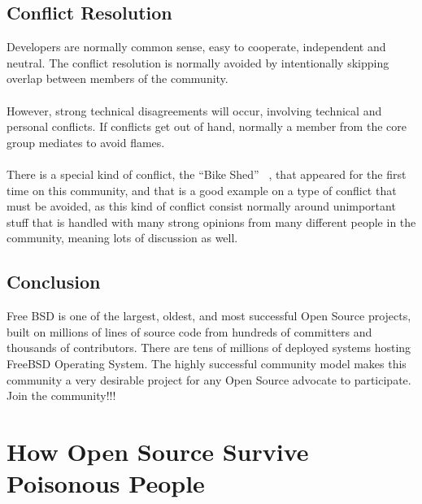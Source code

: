 \documentclass[11pt]{article}
\begin{document}
\subsection{Conflict Resolution}
Developers are normally common sense, easy to cooperate, independent and neutral. The conflict resolution is normally avoided by intentionally skipping overlap between members of the community.\\
\\
However, strong technical disagreements will occur, involving technical and personal conflicts. If conflicts get out of hand, normally a member from the core group mediates to avoid flames.\\
\\
There is a special kind of conflict, the ``Bike Shed'' ~\cite{BIKE00}, that appeared for the first time on this community, and that is a good example on a type of conflict that must be avoided, as this kind of conflict consist normally around unimportant stuff that is handled with many strong opinions from many different people in the community, meaning lots of discussion as well.
\subsection{Conclusion}
Free BSD is one of the largest, oldest, and most successful Open Source projects, built on millions of lines of source code from hundreds of committers and thousands of contributors. There are tens of millions of deployed systems hosting FreeBSD Operating System. The highly successful community model makes this community a very desirable project for any Open Source advocate to participate. Join the community!!!

\pagebreak

\section{How Open Source Survive Poisonous People}
\label{sec:survivepoison}
\end{document}
